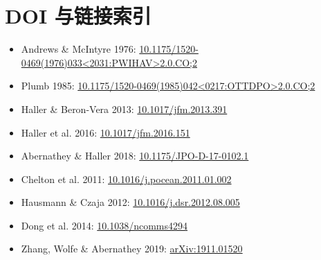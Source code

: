 \documentclass[11pt,a4paper]{ctexart}
\begin{document}
\section*{DOI 与链接索引}
\begin{itemize}
  \item Andrews \& McIntyre 1976: \href{https://doi.org/10.1175/1520-0469(1976)033<2031:PWIHAV>2.0.CO;2}{10.1175/1520-0469(1976)033<2031:PWIHAV>2.0.CO;2}
  \item Plumb 1985: \href{https://doi.org/10.1175/1520-0469(1985)042<0217:OTTDPO>2.0.CO;2}{10.1175/1520-0469(1985)042<0217:OTTDPO>2.0.CO;2}
  \item Haller \& Beron-Vera 2013: \href{https://doi.org/10.1017/jfm.2013.391}{10.1017/jfm.2013.391}
  \item Haller et al. 2016: \href{https://doi.org/10.1017/jfm.2016.151}{10.1017/jfm.2016.151}
  \item Abernathey \& Haller 2018: \href{https://doi.org/10.1175/JPO-D-17-0102.1}{10.1175/JPO-D-17-0102.1}
  \item Chelton et al. 2011: \href{https://doi.org/10.1016/j.pocean.2011.01.002}{10.1016/j.pocean.2011.01.002}
  \item Hausmann \& Czaja 2012: \href{https://doi.org/10.1016/j.dsr.2012.08.005}{10.1016/j.dsr.2012.08.005}
  \item Dong et al. 2014: \href{https://doi.org/10.1038/ncomms4294}{10.1038/ncomms4294}
  \item Zhang, Wolfe \& Abernathey 2019: \href{https://arxiv.org/abs/1911.01520}{arXiv:1911.01520}
\end{itemize}



\end{document}
